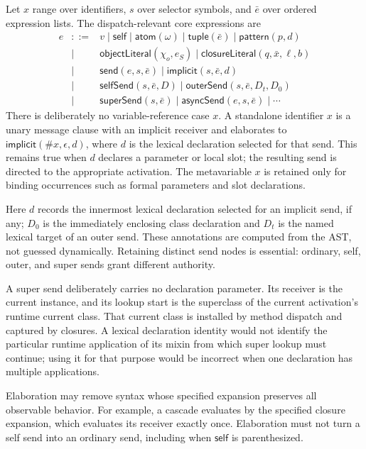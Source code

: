 \documentclass[11pt]{article}
\numberwithin{equation}{section}
\newcommand{\kw}[1]{\ensuremath{\mathsf{#1}}}
\begin{document}
Let $x$ range over identifiers, $s$ over selector symbols, and $\bar e$ over
ordered expression lists.  The dispatch-relevant core expressions are
\begin{equation}\label{eq:core-expressions}
\begin{array}{rcl}
 e &::=& v \mid \kw{self} \mid \kw{atom}(\omega)
          \mid \kw{tuple}(\bar e) \mid \kw{pattern}(p,d) \\
   &\mid& \kw{objectLiteral}(\chi_o,e_S)
          \mid \kw{closureLiteral}(q,\bar x,\ell,b) \\
   &\mid& \kw{send}(e,s,\bar e)
          \mid \kw{implicit}(s,\bar e,d) \\
   &\mid& \kw{selfSend}(s,\bar e,D) \mid
          \kw{outerSend}(s,\bar e,D_t,D_0) \\
   &\mid& \kw{superSend}(s,\bar e) \mid
          \kw{asyncSend}(e,s,\bar e) \mid \cdots
\end{array}
\end{equation}
There is deliberately no variable-reference case $x$.  A standalone identifier
$x$ is a unary message clause with an implicit receiver and elaborates to
$\kw{implicit}(\#x,\epsilon,d)$, where $d$ is the lexical declaration selected
for that send.  This remains true when $d$ declares a parameter or local slot;
the resulting send is directed to the appropriate activation.  The
metavariable $x$ is retained only for binding occurrences such as formal
parameters and slot declarations.

Here $d$ records the innermost lexical declaration selected for an implicit
send, if any; $D_0$ is the immediately enclosing class declaration and $D_t$
is the named lexical target of an outer send.  These annotations are computed
from the AST, not guessed dynamically.  Retaining distinct send nodes is
essential: ordinary, self, outer, and super sends grant different authority.

A super send deliberately carries no declaration parameter.  Its receiver is
the current instance, and its lookup start is the superclass of the current
activation's runtime current class.  That current class is installed by method
dispatch and captured by closures.  A lexical declaration identity would not
identify the particular runtime application of its mixin from which super
lookup must continue; using it for that purpose would be incorrect when one
declaration has multiple applications.

Elaboration may remove syntax whose specified expansion preserves all
observable behavior.  For example, a cascade evaluates by the specified
closure expansion, which evaluates its receiver exactly once.  Elaboration
must not turn a self send into an ordinary send, including when \kw{self} is
parenthesized.
\end{document}
